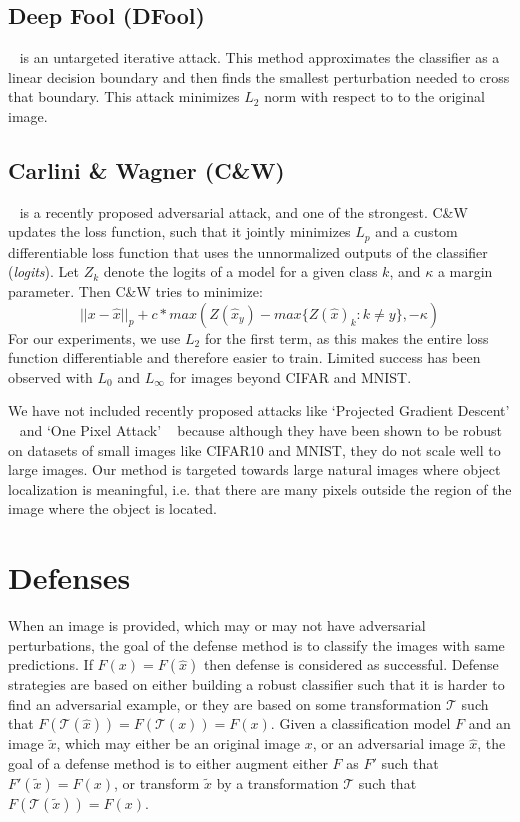 \subsection{Deep Fool (DFool)}
 ~\cite{MoosaviDezfooli2016DeepFoolAS} is an untargeted iterative attack. 
This method approximates the classifier as a linear decision boundary and then finds the smallest perturbation needed to cross that boundary.
This attack minimizes $L_2$ norm with respect to to the original image. 

\subsection{Carlini \& Wagner (C\&W)}
 ~\cite{Carlini2017TowardsET} is a recently proposed adversarial attack, and one of the strongest.
C\&W updates the loss function, such that it jointly minimizes $L_p$ and a custom differentiable loss function that uses the unnormalized outputs of the classifier (\textit{logits}). 
Let $Z_k$ denote the logits of a model for a given class $k$, and $\kappa$ a margin parameter. Then C\&W tries to minimize:
\begin{equation}
|| x - \hat{x} ||_p + c* max\left(Z(\hat{x}_y) - max\{Z(\hat{x})_k : k \neq y\},-\kappa\right)
\end{equation}
For our experiments, we use $L_2$ for the first term, as this makes the entire loss function differentiable and therefore easier to train. 
Limited success has been observed with $L_0$ and $L_\infty$ for images beyond CIFAR and MNIST.

We have not included recently proposed attacks like `Projected Gradient Descent' ~\cite{Madry2017TowardsDL} and `One Pixel Attack' ~\cite{Su2017OnePA} because although they have been shown to be robust on datasets of small images like CIFAR10 and MNIST, they do not scale well to large images. 
Our method is targeted towards large natural images where object localization is meaningful, i.e. that there are many  pixels outside the region of the image where the object is located.


\section{Defenses\label{sec:defenses}}

When an image is provided, which may or may not have adversarial perturbations, the goal of the defense method is to classify the images with same predictions.
If $F(x)=F(\hat{x})$ then defense is considered as successful. 
Defense strategies are based on either building a robust classifier such that it is harder to find an adversarial example, or they are based on some transformation $\mathcal{T}$ such that $F(\mathcal{T}(\hat{x}))=F(\mathcal{T}(x))=F(x)$. 
Given a classification model $F$ and an image $\tilde{x}$, which may either be an original image $x$, or an adversarial image $\hat{x}$, the goal of a defense method is to either augment either $F$ as $F'$ such that $F'(\tilde{x}) = F(x)$, or transform $\tilde{x}$ by a transformation $\mathcal{T}$ such that $F(\mathcal{T}(\tilde{x}))=F(x)$.

